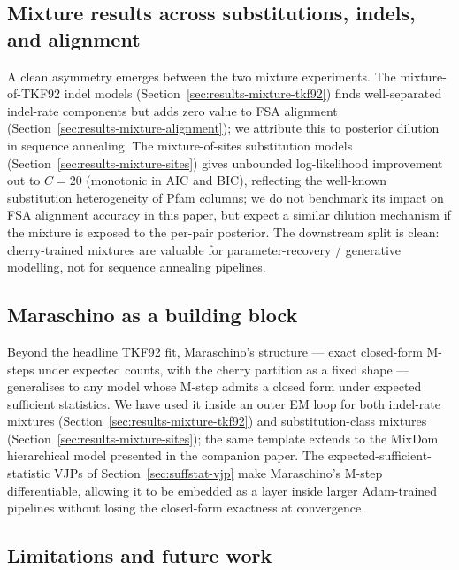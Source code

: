 \subsection{Mixture results across substitutions, indels, and alignment}
\label{sec:discussion-mixtures}

A clean asymmetry emerges between the two mixture experiments.
The mixture-of-TKF92 indel models
(Section~\ref{sec:results-mixture-tkf92}) finds well-separated
indel-rate components but adds zero value to FSA alignment
(Section~\ref{sec:results-mixture-alignment}); we attribute this
to posterior dilution in sequence annealing.  The mixture-of-sites
substitution models (Section~\ref{sec:results-mixture-sites})
gives unbounded log-likelihood improvement out to $C = 20$
(monotonic in AIC and BIC), reflecting the well-known
substitution heterogeneity of Pfam columns; we do not benchmark
its impact on FSA alignment accuracy in this paper, but expect a
similar dilution mechanism if the mixture is exposed to the
per-pair posterior.  The downstream split is clean: cherry-trained
mixtures are valuable for parameter-recovery / generative modelling,
not for sequence annealing pipelines.

\subsection{Maraschino as a building block}
\label{sec:discussion-maraschino-building-block}

Beyond the headline TKF92 fit, Maraschino's structure --- exact
closed-form M-steps under expected counts, with the cherry
partition as a fixed shape ---
generalises to any model whose
M-step admits a closed form under expected sufficient statistics.
We have used it inside an outer EM loop for both indel-rate
mixtures (Section~\ref{sec:results-mixture-tkf92}) and
substitution-class mixtures
(Section~\ref{sec:results-mixture-sites}); the same template
extends to the MixDom hierarchical model presented in the
companion paper.  The expected-sufficient-statistic VJPs of
Section~\ref{sec:suffstat-vjp} make Maraschino's M-step
differentiable, allowing it to be embedded as a layer inside
larger Adam-trained pipelines without losing the closed-form
exactness at convergence.

\subsection{Limitations and future work}
\label{sec:discussion-limitations}

